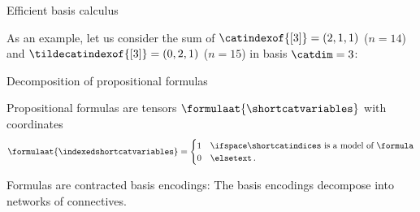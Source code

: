 \documentclass{beamer}
\begin{document}
    \begin{frame}{Efficient basis calculus}

        As an example, let us consider the sum of $\catindexof{[3]}=(2,1,1)$ ($n=14$) and $\tildecatindexof{[3]}=(0,2,1)$ ($n=15$) in basis $\catdim=3$:

        \begin{center}
            
        \end{center}

    \end{frame}

    \begin{frame}{Decomposition of propositional formulas}

        Propositional formulas are tensors $\formulaat{\shortcatvariables}$ with coordinates
        \begin{align*}
            \formulaat{\indexedshortcatvariables}
            = \begin{cases}
                  1 & \ifspace \shortcatindices \text{ is a model of } $\formula$ \\
                  0 & \elsetext \, .
            \end{cases}
        \end{align*}

        Formulas are contracted basis encodings:
        \vspace{-1cm}
%
        The basis encodings decompose into networks of connectives.


\end{frame}
\end{document}
